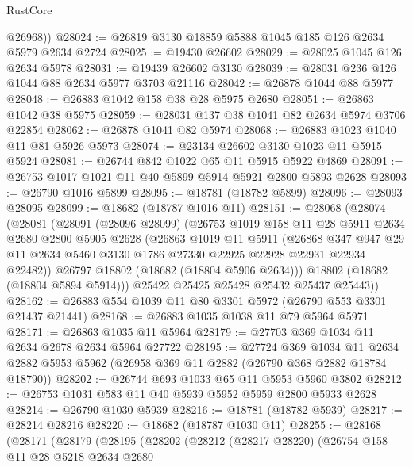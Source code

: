 \begin{lexlean}{RustCore}
\begin{coremodule}
        @26968))
@28024 := @26819 @3130 @18859 @5888 @1045 @185 @126 @2634 @5979 @2634 @2724
@28025 := @19430 @26602
@28029 := @28025 @1045 @126 @2634 @5978
@28031 := @19439 @26602 @3130
@28039 := @28031 @236 @126 @1044 @88 @2634 @5977 @3703 @21116
@28042 := @26878 @1044 @88 @5977
@28048 := @26883 @1042 @158 @38 @28 @5975 @2680
@28051 := @26863 @1042 @38 @5975
@28059 := @28031 @137 @38 @1041 @82 @2634 @5974 @3706 @22854
@28062 := @26878 @1041 @82 @5974
@28068 := @26883 @1023 @1040 @11 @81 @5926 @5973
@28074 := @23134 @26602 @3130 @1023 @11 @5915 @5924
@28081 := @26744 @842 @1022 @65 @11 @5915 @5922 @4869
@28091 := @26753 @1017 @1021 @11 @40 @5899 @5914 @5921 @2800 @5893 @2628
@28093 := @26790 @1016 @5899
@28095 := @18781 (@18782 @5899)
@28096 := @28093 @28095
@28099 := @18682 (@18787 @1016 @11)
@28151 := @28068
    (@28074
      (@28081
        (@28091
          (@28096 @28099)
          (@26753
            @1019
            @158
            @11
            @28
            @5911
            @2634
            @2680
            @2800
            @5905
            @2628
            (@26863
              @1019
              @11
              @5911
              (@26868
                @347
                @947
                @29
                @11
                @2634
                @5460
                @3130
                @1786
                @27330
                @22925
                @22928
                @22931
                @22934
                @22482))
            @26797
            @18802
            (@18682 (@18804 @5906 @2634)))
          @18802
          (@18682 (@18804 @5894 @5914)))
        @25422
        @25425
        @25428
        @25432
        @25437
        @25443))
@28162 := @26883 @554 @1039 @11 @80 @3301 @5972 (@26790 @553 @3301 @21437 @21441)
@28168 := @26883 @1035 @1038 @11 @79 @5964 @5971
@28171 := @26863 @1035 @11 @5964
@28179 := @27703 @369 @1034 @11 @2634 @2678 @2634 @5964 @27722
@28195 := @27724
    @369
    @1034
    @11
    @2634
    @2882
    @5953
    @5962
    (@26958 @369 @11 @2882 (@26790 @368 @2882 @18784 @18790))
@28202 := @26744 @693 @1033 @65 @11 @5953 @5960 @3802
@28212 := @26753 @1031 @583 @11 @40 @5939 @5952 @5959 @2800 @5933 @2628
@28214 := @26790 @1030 @5939
@28216 := @18781 (@18782 @5939)
@28217 := @28214 @28216
@28220 := @18682 (@18787 @1030 @11)
@28255 := @28168
    (@28171
      (@28179
        (@28195
          (@28202
            (@28212
              (@28217 @28220)
              (@26754
                @158
                @11
                @28
                @5218
                @2634
                @2680

\end{coremodule}
\end{lexlean}
